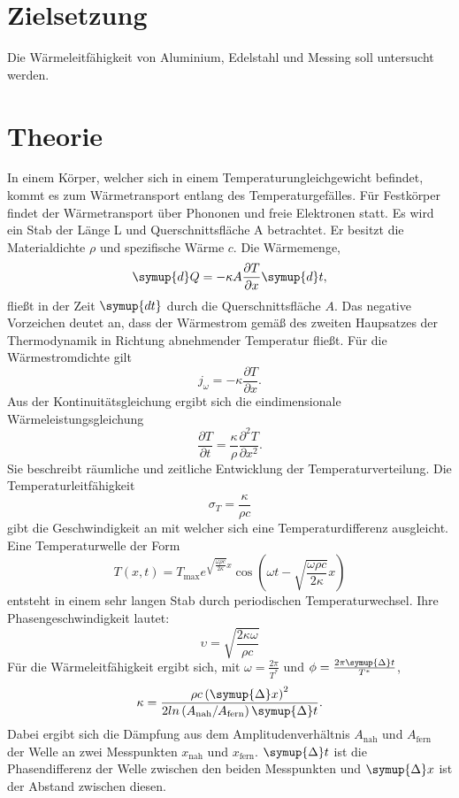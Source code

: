 \section{Zielsetzung}
Die Wärmeleitfähigkeit von Aluminium, Edelstahl und Messing soll untersucht werden.
\section{Theorie}
\label{sec:Theorie}
In einem Körper, welcher sich in einem Temperaturungleichgewicht befindet, kommt es zum Wärmetransport entlang des Temperaturgefälles.
Für Festkörper findet der Wärmetransport über Phononen und freie Elektronen statt.
Es wird ein Stab der Länge L und Querschnittsfläche A betrachtet.
Er besitzt die Materialdichte $\rho$ und spezifische Wärme $c$.
Die Wärmemenge,
\begin{equation}
  \label{eqn:gl1}
    \symup{d}Q =-  \kappa A \frac{\partial T}{\partial x} \symup{d}t,
\end{equation}
fließt in der Zeit $\symup{dt}$ durch die Querschnittsfläche $A$.
Das negative Vorzeichen deutet an, dass der Wärmestrom gemäß des zweiten Haupsatzes der
Thermodynamik in Richtung abnehmender Temperatur fließt.
Für die Wärmestromdichte gilt
\begin{equation}
    j_\omega =- \kappa \frac{\partial T}{\partial x}.
\end{equation}
Aus der Kontinuitätsgleichung ergibt sich die eindimensionale Wärmeleistungsgleichung
\begin{equation}
    \frac{\partial T}{\partial t} = \frac {\kappa}{\rho} \frac{\partial^2  T}{\partial x^2}.
\end{equation}
Sie beschreibt räumliche und zeitliche Entwicklung der Temperaturverteilung.
Die Temperaturleitfähigkeit
\begin{equation}
    \sigma_T = \frac{\kappa}{\rho c}
\end{equation}
gibt die Geschwindigkeit an mit welcher sich eine Temperaturdifferenz ausgleicht.
%
Eine Temperaturwelle der Form
\begin{equation}
    T\left(x,t\right) = T_\text{max}e^{\sqrt{\frac{\omega\rho c}{2 \kappa}}x} \cos\left(\omega t - \sqrt{\frac{\omega\rho c}{2 \kappa}}x\right)
\label{eqn:thermowelle}
\end{equation}
entsteht in einem sehr langen Stab durch periodischen Temperaturwechsel.
Ihre Phasengeschwindigkeit lautet:
\begin{equation}
    \upsilon = \sqrt{\frac{2\kappa\omega}{\rho c}}
\end{equation}
Für die Wärmeleitfähigkeit ergibt sich, mit  $\omega=\frac{2\pi}{T^*}$ und $\phi=\frac{2\pi\symup{\Delta}t}{T^*}$,
\begin{equation}
    \kappa = \frac{\rho c\left(\symup{\Delta}x\right)^2}{2 ln\left(A_\text{nah}/A_\text{fern}\right)\symup{\Delta}t}.
    \label{eqn:wleitfaehigkeit}
\end{equation}
Dabei ergibt sich die Dämpfung aus dem Amplitudenverhältnis $A_\text{nah}$ und $A_\text{fern}$ der Welle an zwei Messpunkten
$x_\text{nah}$ und $x_\text{fern}$.
$\symup{\Delta}t$ ist die Phasendifferenz der Welle zwischen den beiden Messpunkten und $\symup{\Delta}x$ ist der Abstand zwischen
diesen.
